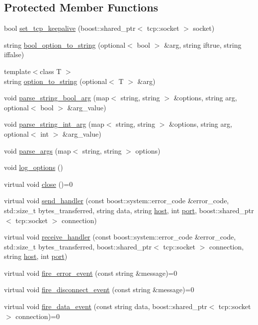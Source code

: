 \subsection*{Protected Member Functions}
\begin{DoxyCompactItemize}
\item 
bool \hyperlink{classTcp_aea9e4a82b08f1893900dad21a1fedfb7}{set\_\-tcp\_\-keepalive} (boost::shared\_\-ptr$<$ tcp::socket $>$ socket)
\item 
string \hyperlink{classTcp_af93fb7459faba8da96f1df55728dfeee}{bool\_\-option\_\-to\_\-string} (optional$<$ bool $>$ \&arg, string iftrue, string iffalse)
\item 
{\footnotesize template$<$class T $>$ }\\string \hyperlink{classTcp_a6324523a33b5830641fd22e32bab8066}{option\_\-to\_\-string} (optional$<$ T $>$ \&arg)
\item 
void \hyperlink{classTcp_a5eae377b9c7c4e49a210a0372bdb9f73}{parse\_\-string\_\-bool\_\-arg} (map$<$ string, string $>$ \&options, string arg, optional$<$ bool $>$ \&arg\_\-value)
\item 
void \hyperlink{classTcp_a91de22f151e40c56638ae54899f1be5a}{parse\_\-string\_\-int\_\-arg} (map$<$ string, string $>$ \&options, string arg, optional$<$ int $>$ \&arg\_\-value)
\item 
void \hyperlink{classTcp_a65753a8c2d9bad07216abdcd5a8a1e86}{parse\_\-args} (map$<$ string, string $>$ options)
\item 
void \hyperlink{classTcp_a59aee046563f221c89ab4b56146fcdc7}{log\_\-options} ()
\item 
virtual void \hyperlink{classTcp_a48b0192669ab99dc953ab3feae5c1b1c}{close} ()=0
\item 
virtual void \hyperlink{classTcp_a447cf3ccc28a073a6b871dd1f597c28d}{send\_\-handler} (const boost::system::error\_\-code \&error\_\-code, std::size\_\-t bytes\_\-transferred, string data, string \hyperlink{classTcp_a0e981d15f94a460b91845bce9b930c61}{host}, int \hyperlink{classTcp_a7ed15f78afc9d0675404b4b41cc723ba}{port}, boost::shared\_\-ptr$<$ tcp::socket $>$ connection)
\item 
virtual void \hyperlink{classTcp_a96707e496b0fcef660c3f22fb6efc0fd}{receive\_\-handler} (const boost::system::error\_\-code \&error\_\-code, std::size\_\-t bytes\_\-transferred, boost::shared\_\-ptr$<$ tcp::socket $>$ connection, string \hyperlink{classTcp_a0e981d15f94a460b91845bce9b930c61}{host}, int \hyperlink{classTcp_a7ed15f78afc9d0675404b4b41cc723ba}{port})
\item 
virtual void \hyperlink{classTcp_a9798750750bc775de9a16d0f148bc002}{fire\_\-error\_\-event} (const string \&message)=0
\item 
virtual void \hyperlink{classTcp_a69d92d55403e877f252bbfbfd7c02ec2}{fire\_\-disconnect\_\-event} (const string \&message)=0
\item 
virtual void \hyperlink{classTcp_a7e5cfd764f04ca5e2729924b9d537db2}{fire\_\-data\_\-event} (const string data, boost::shared\_\-ptr$<$ tcp::socket $>$ connection)=0
\end{DoxyCompactItemize}
